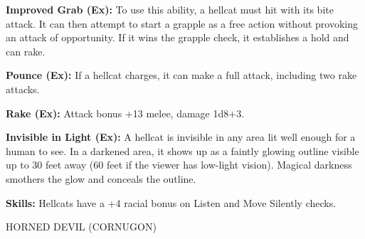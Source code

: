\documentclass{article}
\begin{document}
\textbf{Improved Grab (Ex):} To use this ability, a hellcat must hit with its bite 
attack. It can then attempt to start a grapple as a free action without provoking 
an attack of opportunity. If it wins the grapple check, it establishes a hold and 
can rake.

\textbf{Pounce (Ex):} If a hellcat charges, it can make a full attack, including 
two rake attacks.

\textbf{Rake (Ex):} Attack bonus +13 melee, damage 1d8+3.

\textbf{Invisible in Light (Ex):} A hellcat is invisible in any area lit well enough 
for a human to see. In a darkened area, it shows up as a faintly glowing outline 
visible up to 30 feet away (60 feet if the viewer has low-light vision). Magical 
darkness smothers the glow and conceals the outline.

\textbf{Skills:} Hellcats have a +4 racial bonus on Listen and Move Silently checks.

\vspace{12pt}
HORNED DEVIL (CORNUGON)
\end{document}
